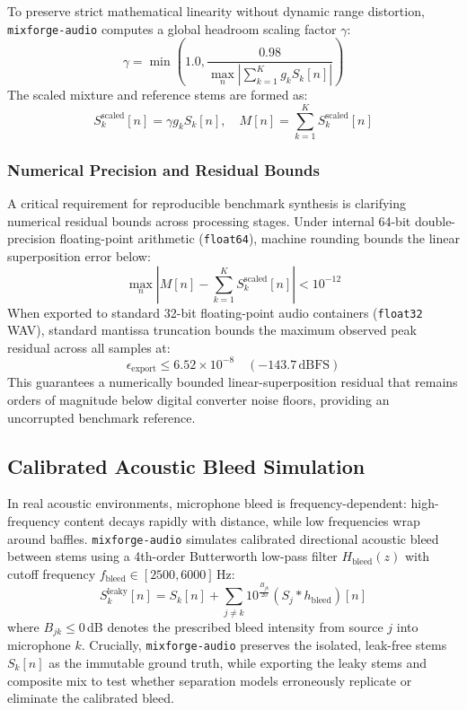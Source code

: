 \documentclass[10pt,journal,compsoc]{IEEEtran}
\begin{document}
To preserve strict mathematical linearity without dynamic range distortion, \texttt{mixforge-audio} computes a global headroom scaling factor $\gamma$:
\begin{equation}
\gamma = \min\left(1.0, \frac{0.98}{\max_n \left| \sum_{k=1}^K g_k S_k[n] \right|}\right)
\end{equation}
The scaled mixture and reference stems are formed as:
\begin{equation}
S_k^{\text{scaled}}[n] = \gamma g_k S_k[n], \quad M[n] = \sum_{k=1}^K S_k^{\text{scaled}}[n]
\end{equation}

\subsubsection{Numerical Precision and Residual Bounds}
A critical requirement for reproducible benchmark synthesis is clarifying numerical residual bounds across processing stages. Under internal 64-bit double-precision floating-point arithmetic (\texttt{float64}), machine rounding bounds the linear superposition error below:
\begin{equation}
\max_n \left| M[n] - \sum_{k=1}^K S_k^{\text{scaled}}[n] \right| < 10^{-12}
\end{equation}
When exported to standard 32-bit floating-point audio containers (\texttt{float32} WAV), standard mantissa truncation bounds the maximum observed peak residual across all samples at:
\begin{equation}
\epsilon_{\text{export}} \le 6.52 \times 10^{-8} \quad (-143.7\,\text{dBFS})
\end{equation}
This guarantees a numerically bounded linear-superposition residual that remains orders of magnitude below digital converter noise floors, providing an uncorrupted benchmark reference.

\subsection{Calibrated Acoustic Bleed Simulation}
In real acoustic environments, microphone bleed is frequency-dependent: high-frequency content decays rapidly with distance, while low frequencies wrap around baffles. \texttt{mixforge-audio} simulates calibrated directional acoustic bleed between stems using a 4th-order Butterworth low-pass filter $H_{\text{bleed}}(z)$ with cutoff frequency $f_{\text{bleed}} \in [2500, 6000]$\,Hz:
\begin{equation}
S_k^{\text{leaky}}[n] = S_k[n] + \sum_{j \ne k} 10^{\frac{B_{jk}}{20}} (S_j * h_{\text{bleed}})[n]
\end{equation}
where $B_{jk} \le 0$\,dB denotes the prescribed bleed intensity from source $j$ into microphone $k$. Crucially, \texttt{mixforge-audio} preserves the isolated, leak-free stems $S_k[n]$ as the immutable ground truth, while exporting the leaky stems and composite mix to test whether separation models erroneously replicate or eliminate the calibrated bleed.
\end{document}
